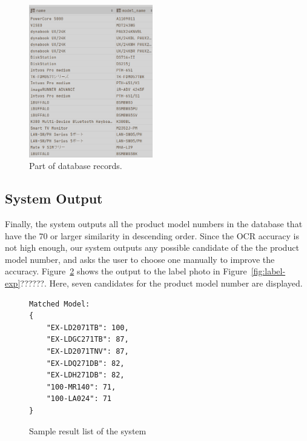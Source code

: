 \documentclass[technicalreport]{ieicej}
\begin{document}
            \begin{figure}[t] 
                \begin{center}
                \includegraphics[width=0.48\textwidth]{figure/db-sample.png}
                \end{center}
                \caption{Part of database records.}
                \label{fig:db-sample}
            \end{figure}

\subsection{System Output}
Finally, the system outputs all the product model numbers in the database that have the $70$ or larger similarity in descending order. Since the OCR accuracy is not high enough, our system outputs any possible candidate of the the product model number, and asks the user to choose one manually to improve the accuracy. Figure~\ref{fig:result-sample} shows the output to the label photo in Figure~\ref{fig:label-exp}??????. Here, seven candidates for the product model number are displayed. 

        \begin{figure}[t] 
            \begin{center}
        \begin{BVerbatim}
Matched Model:
{
    "EX-LD2071TB": 100,
    "EX-LDGC271TB": 87,
    "EX-LD2071TNV": 87,
    "EX-LDQ271DB": 82,
    "EX-LDH271DB": 82,
    "100-MR140": 71,
    "100-LA024": 71
}
        \end{BVerbatim}
        \end{center}
            \caption{Sample result list of the system}
            \label{fig:result-sample}
        \end{figure}
\end{document}
